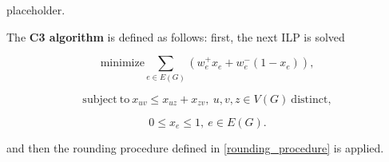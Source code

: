 placeholder. 

%

\begin{definition}[C3] \label{c3_final}
    The \textbf{C3 algorithm} is defined as follows: first, the next ILP is solved

    \begin{equation}
        \mathrm{minimize} \sum_{e \in E(G)} (w_e^+x_e + w_e^-(1 - x_e)),
    \end{equation}

    \begin{equation}
        \mathrm{subject \ to \ } x_{uv} \le x_{uz} + x_{zv}, \ u, v, z \in V(G) \mathrm{\ distinct},
    \end{equation}

    \begin{equation}
        0 \le x_e \le 1, \ e \in E(G).
    \end{equation}

    and then the rounding procedure defined in \cref{rounding_procedure} is applied.

\end{definition}

\cleardoublepage
